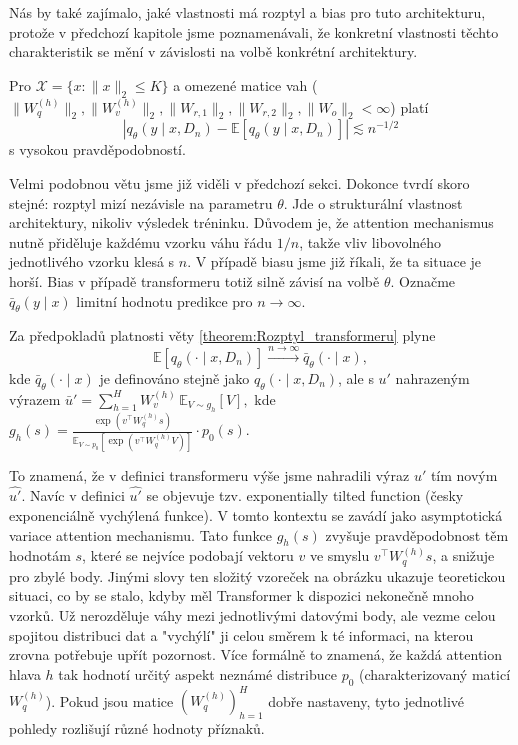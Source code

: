 Nás by také zajímalo, jaké vlastnosti má rozptyl a bias pro tuto architekturu, protože v předchozí kapitole jsme poznamenávali, že konkretní vlastnosti těchto charakteristik se mění v závislosti na volbě konkrétní architektury.
\begin{theorem}
    Pro $\mathcal{X} = \{x : \|x\|_2 \leq K\}$ a omezené matice vah ($\|W^{(h)}_q\|_2, \|W^{(h)}_v\|_2, \|W_{r,1}\|_2, \|W_{r,2}\|_2, \|W_o\|_2 < \infty$) platí
    \begin{equation}
            \left|q_\theta(y \mid x, D_n) - \mathbb{E}[q_\theta(y \mid x, D_n)]\right| \lesssim n^{-1/2}
    \end{equation}
s vysokou pravděpodobností.
\label{theorem:Rozptyl_transformeru}
\end{theorem}

Velmi podobnou větu jsme již viděli v předchozí sekci.
Dokonce tvrdí skoro stejné: rozptyl mizí nezávisle na parametru $\theta$.
Jde o strukturální vlastnost architektury, nikoliv výsledek tréninku. 
Důvodem je, že attention mechanismus nutně přiděluje každému vzorku váhu řádu $1/n$, takže vliv libovolného jednotlivého vzorku klesá s $n$.
V případě biasu jsme již říkali, že ta situace je horší. 
Bias v případě transformeru totiž silně závisí na volbě $\theta$.
Označme $\bar{q}_\theta(y \mid x)$ limitní hodnotu predikce pro $n \to \infty$.
\begin{theorem}
    Za předpokladů platnosti věty \ref{theorem:Rozptyl_transformeru} plyne
    \begin{equation}
            \mathbb{E}[q_\theta(\cdot \mid x, D_n)] \xrightarrow{n \to \infty} \bar{q}_\theta(\cdot \mid x),
    \end{equation}
    kde $\bar{q}_\theta(\cdot \mid x)$ je definováno stejně jako $q_\theta(\cdot \mid x, D_n)$, ale s $u'$ nahrazeným výrazem $\bar{u}' = \sum_{h=1}^{H} W^{(h)}_v \, \mathbb{E}_{V \sim g_h}[V],$
    kde $g_h(s) = \frac{\exp(v^\top W^{(h)}_q s)}{\mathbb{E}_{V \sim p_0}[\exp(v^\top W^{(h)}_q V)]} \cdot p_0(s).$
\end{theorem}

To znamená, že v definici transformeru výše jsme nahradili výraz $u'$ tím novým $\hat{u'}$.
Navíc v definici $\hat{u'}$ se objevuje tzv. exponentially tilted function (česky exponenciálně vychýlená funkce).
V tomto kontextu se zavádí jako asymptotická variace attention mechanismu.
Tato funkce $g_h(s)$ zvyšuje pravděpodobnost těm hodnotám $s$, které se nejvíce podobají vektoru $v$ ve smyslu $v^\top W^{(h)}_q s$, a snižuje pro zbylé body.
Jinými slovy ten složitý vzoreček na obrázku ukazuje teoretickou situaci, co by se stalo, kdyby měl Transformer k dispozici nekonečně mnoho vzorků. 
Už nerozděluje váhy mezi jednotlivými datovými body, ale vezme celou spojitou distribuci dat a "vychýlí" ji celou směrem k té informaci, na kterou zrovna potřebuje upřít pozornost.
Více formálně to znamená, že každá attention hlava $h$ tak hodnotí určitý aspekt neznámé distribuce $p_0$ (charakterizovaný maticí $W^{(h)}_q$). 
Pokud jsou matice $(W^{(h)}_q)_{h=1}^H$ dobře nastaveny, tyto jednotlivé pohledy rozlišují různé hodnoty příznaků.
\par   

